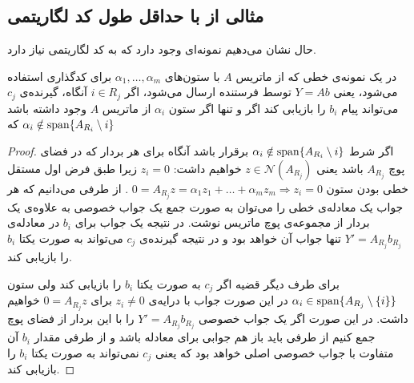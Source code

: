 \subsection{
	مثالی از
\picod
با حداقل طول کد لگاریتمی
}
حال نشان می‌دهیم نمونه‌ای وجود دارد که به کد لگاریتمی نیاز دارد.
\begin{lemma}
	\label{lemma:algebraicconstraint}
	در یک نمونه‌ی
	\picod
	خطی که از ماتریس
	$A$
	با ستون‌های 
	$\alpha_1, \ldots, \alpha_m$
	برای کدگذاری استفاده می‌شود، یعنی
	$Y = A b$
	توسط فرستنده ارسال می‌شود، اگر
	$i \in R_j$
	آنگاه، گیرنده‌‌ی 
	$c_j$
	می‌تواند پیام 
	$b_i$
	را بازیابی کند اگر و تنها اگر ستون
	$\alpha_i$
	از ماتریس
	$A$
	وجود داشته باشد که
	$\alpha_i \notin \operatorname{span} \{A_{R_i} \setminus i\}$
\end{lemma}
\begin{proof}
	اگر شرط
	$\alpha_i \notin \operatorname{span}\{A_{R_i} \setminus i\}$
	برقرار باشد آنگاه برای هر بردار که در فضای پوچ
	$A_{R_j}$
	باشد یعنی
	$z \in \mathcal{N}(A_{R_j})$
	خواهیم داشت:
	$z_i = 0$
	زیرا طبق فرض اول مستقل خطی بودن ستون
	$0 = A_{R_j} z  = \alpha_1 z_1 + \ldots + \alpha_m z_m \Rightarrow z_i = 0$
	.  از طرفی می‌دانیم که هر جواب یک معادله‌ی خطی را می‌توان به صورت جمع یک جواب خصوصی به علاوه‌ی یک بردار از مجموعه‌ی پوچ ماتریس نوشت. در نتیجه یک جواب برای 
	$b_i$
	در معادله‌ی
	$Y' = A_{R_j} b_{R_j}$
	تنها جواب آن خواهد بود و در نتیجه گیرنده‌ی
	$c_j$
	می‌تواند به صورت یکتا
	$b_i$
	را بازیابی کند.
	
	برای طرف دیگر قضیه اگر 
	$c_j$
	به صورت یکتا
	$b_i$
	را بازیابی کند ولی ستون
	$\alpha_i \in \operatorname{span}\{A_{R_j} \setminus \{i\}\}$
	در این صورت جواب با درایه‌ی
	$z_i \neq 0$
	برای
	$0 = A_{R_j} z$
	خواهیم داشت. در این صورت اگر یک جواب خصوصی
	$Y' = A_{R_j} b_{R_j}$
	را با این بردار از فضای پوچ جمع کنیم از طرفی باید باز هم جوابی برای معادله باشد و از طرفی مقدار
	$b_i$
	آن متفاوت با جواب خصوصی اصلی خواهد بود که یعنی 
	$c_j$
	نمی‌تواند به صورت یکتا
	$b_i$
	را بازیابی کند.	
\end{proof}

